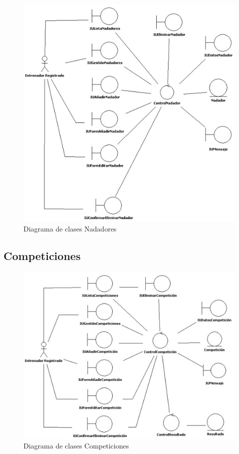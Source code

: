 			\begin{figure}[H]
			  \centering
			    \includegraphics[width=14cm]{./eps/an_diagclases/GestionNadadores.eps}
			  \caption{Diagrama de clases Nadadores}
			  \label{fig:an_diagclases_nadadores}
			\end{figure}
			
	
		\subsection{Competiciones} %
			\label{sub:competiciones}
		
			\begin{figure}[H]
			  \centering
			    \includegraphics[width=14cm]{./eps/an_diagclases/GestionCompeticiones.eps}
			  \caption{Diagrama de clases Competiciones}
			  \label{fig:an_diagclases_competiciones}
			\end{figure}
		

